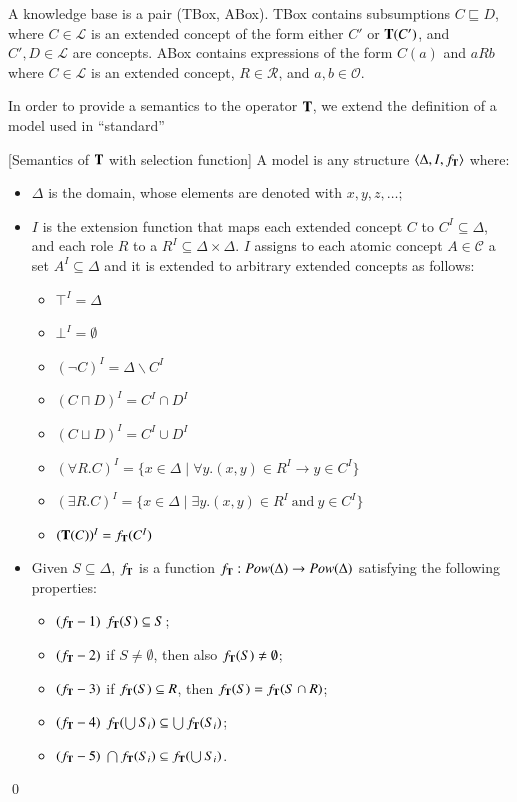\documentclass[a4paper, 11pt, oneside]{elsarticle}
\newcommand{\tip}{{\bf T}}
\newcommand{\vuoto} {\emptyset}
\newcommand{\nott} {\lnot}
\newcommand{\tc} {\mid}
\newcommand{\imp} {\rightarrow}
\newcommand{\elle} {\mathcal{L}}
\newenvironment{definition}
{\begin{defi} \rm}{\qed \end{defi}}
\newcounter{posu}
\newtheorem{definition}[posu]{Definition}
\begin{document}
\noindent  A knowledge base is a pair (TBox, ABox). TBox
contains subsumptions $C \sqsubseteq D$, where $C \in \elle$ is
an extended concept of the form either $C'$ or $\tip(C')$, and $C', D \in
\elle$ are concepts. ABox contains expressions of the form $C(a)$
and $aRb$ where $C \in \elle$ is an extended concept, $R \in
\mathcal{R}$, and $a, b \in \mathcal{O}$.



In order to provide a semantics to the operator $\tip$, we extend the definition of a model used in ``standard''

\begin{definition}[Semantics of $\tip$ with selection function]\label{Semantics
with f_tip} A model is any structure $\langle \Delta, I, f_\tip \rangle$
where:

\begin{itemize}
\item $\Delta$ is the domain, whose elements are denoted with $x, y, z, \dots$;
\item $I$ is the extension function that
maps each extended concept $C$
to $C^I \subseteq \Delta$, and each role $R$ to a $R^I \subseteq
\Delta \times \Delta$. $I$ assigns to each atomic concept $A \in
\mathcal{C}$ a set $A^I \subseteq \Delta$ and it is extended to
arbitrary extended concepts as follows:

\begin{itemize}
  \item $\top^I=\Delta$
  \item $\bot^I=\vuoto$
  \item $(\nott C)^I=\Delta \backslash C^I$
  \item $(C \sqcap D)^I=C^I \cap D^I$
  \item $(C \sqcup D)^I=C^I \cup D^I$
  \item $(\forall R.C)^I=\{x \in \Delta \tc \forall y. (x,y) \in R^I \imp y \in C^I\}$
  \item $(\exists R.C)^I=\{x \in \Delta \tc \exists y.(x,y) \in R^I \ \mbox{and} \ y \in C^I\}$
  \item $(\tip(C))^I = f_\tip(C^I)$
\end{itemize}


\item Given $S \subseteq \Delta$, $f_\tip$ is a function $f_\tip : Pow(\Delta) \rightarrow Pow(\Delta)$
satisfying the
following properties:

\begin{itemize}
\item $(f_\tip-1)$ $f_\tip(S) \subseteq S$;
\item $(f_\tip-2)$ if $S \neq \emptyset$, then also $f_\tip(S)
\neq \emptyset$;
\item $(f_\tip-3)$ if $f_\tip(S) \subseteq R$, then $f_\tip(S) = f_\tip(S \cap R)$;
 \item $(f_\tip-4)$ $f_\tip(\bigcup S_i ) \subseteq \bigcup f_\tip(S_i)$;
\item $(f_\tip-5)$ $\bigcap f_\tip(S_i) \subseteq  f_\tip(\bigcup S_i)$.
\end{itemize}

\end{itemize}

\end{definition}
\end{document}
